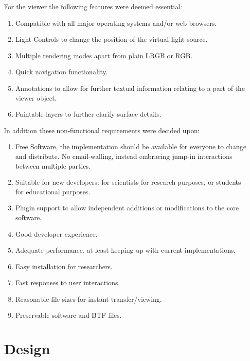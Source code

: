 For the viewer the following features were deemed essential:
\begin{enumerate}[resume]
\item Compatible with all major operating systems and/or web browsers.\label{req_system}
\item Light Controls to change the position of the virtual light source.
\item Multiple rendering modes apart from plain LRGB or RGB.
\item Quick navigation functionality.
\item Annotations to allow for further textual information relating to a part of
  the viewer object.
\item Paintable layers to further clarify surface details.
\end{enumerate}

In addition these non-functional requirements were decided upon:
\begin{enumerate}[resume]
\item  Free Software, the implementation should be available for everyone to
  change and distribute. No email-walling, instead embracing jump-in
  interactions between multiple parties. \label{req_os}
\item Suitable for new developers: for scientists for research purposes,
  or students for educational purposes. \label{req_easy}
\item Plugin support to allow independent additions or modifications to the core software.
\item Good developer experience. \label{req_dx}
\item Adequate performance, at least keeping up with current
  implementations. \label{req_performance}
\item Easy installation for
  researchers. \label{req_install}
\item Fast responses to user interactions. \label{req_react}
\item Reasonable file sizes for instant transfer/viewing.
\item Preservable software and BTF files.\label{req_preserve}
\end{enumerate}

\section{Design}

